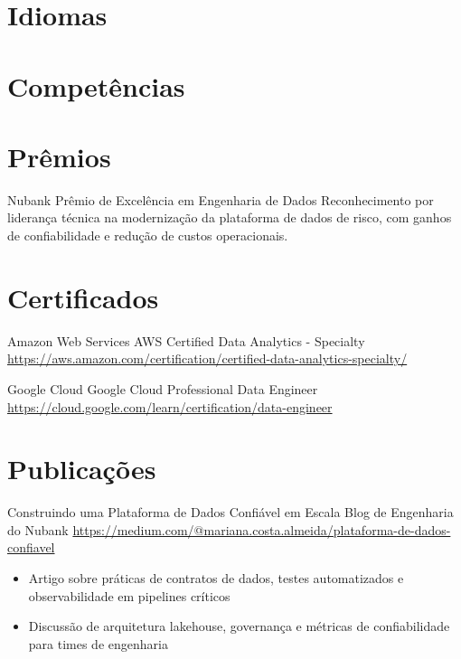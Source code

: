 \documentclass[a4paper, serif, 10pt]{moderncv}
\begin{document}
\section{Idiomas}

\section{Competências}

\section{Prêmios}

        {Nubank}
        {Prêmio de Excelência em Engenharia de Dados}
        {}
        {}
        {Reconhecimento por liderança técnica na modernização da plataforma de dados de risco, com ganhos de confiabilidade e redução de custos operacionais.}
\section{Certificados}

        {Amazon Web Services}
        {AWS Certified Data Analytics - Specialty}
        {\url{https://aws.amazon.com/certification/certified-data-analytics-specialty/}}
        {}
        {}

        {Google Cloud}
        {Google Cloud Professional Data Engineer}
        {\url{https://cloud.google.com/learn/certification/data-engineer}}
        {}
        {}
\section{Publicações}

        {Construindo uma Plataforma de Dados Confiável em Escala}
        {Blog de Engenharia do Nubank}
        {\url{https://medium.com/@mariana.costa.almeida/plataforma-de-dados-confiavel}}
        {}
        {\begin{itemize}
\item Artigo sobre práticas de contratos de dados, testes automatizados e observabilidade em pipelines críticos
\item Discussão de arquitetura lakehouse, governança e métricas de confiabilidade para times de engenharia
\end{itemize}}
\end{document}
